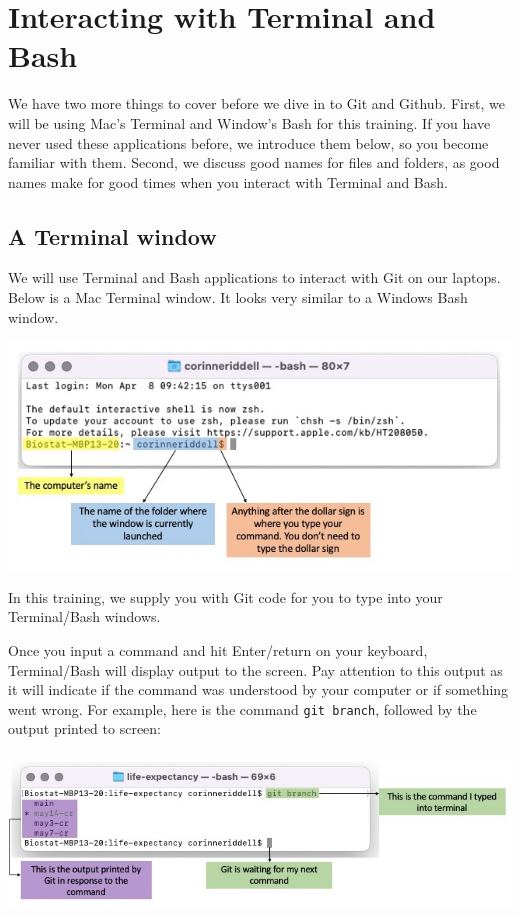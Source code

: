 \documentclass[
]{book}
\begin{document}
\chapter{Interacting with Terminal and Bash}\label{interacting-with-terminal-and-bash}

We have two more things to cover before we dive in to Git and Github. First,
we will be using Mac's Terminal and Window's Bash for this training. If you
have never used these applications before, we introduce them below, so you
become familiar with them. Second, we discuss good names for files and folders,
as good names make for good times when you interact with Terminal and Bash.

\section{A Terminal window}\label{a-terminal-window}

We will use Terminal and Bash applications to interact with Git on our laptops.
Below is a Mac Terminal window. It looks very similar to a Windows Bash window.

\includegraphics[width=1\linewidth]{./figures/Terminal-explainer-1}

In this training, we supply you with Git code for you to type into
your Terminal/Bash windows.

Once you input a command and hit Enter/return on
your keyboard, Terminal/Bash will display output to the screen. Pay attention
to this output as it will indicate if the command was understood by your
computer or if something went wrong. For example, here is the command
\texttt{git\ branch}, followed by the output printed to screen:

\includegraphics[width=1\linewidth]{./figures/Terminal-explainer-2}
\end{document}
